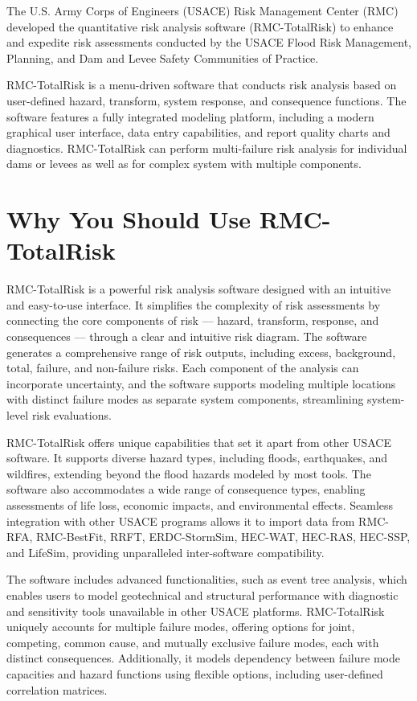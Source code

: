 \documentclass[
]{book}
\begin{document}
The U.S. Army Corps of Engineers (USACE) Risk Management Center (RMC) developed the quantitative risk analysis software (RMC-TotalRisk) to enhance and expedite risk assessments conducted by the USACE Flood Risk Management, Planning, and Dam and Levee Safety Communities of Practice.

RMC-TotalRisk is a menu-driven software that conducts risk analysis based on user-defined hazard, transform, system response, and consequence functions. The software features a fully integrated modeling platform, including a modern graphical user interface, data entry capabilities, and report quality charts and diagnostics. RMC-TotalRisk can perform multi-failure risk analysis for individual dams or levees as well as for complex system with multiple components.

\hypertarget{why-you-should-use-rmc-totalrisk}{%
\section{Why You Should Use RMC-TotalRisk}\label{why-you-should-use-rmc-totalrisk}}

RMC-TotalRisk is a powerful risk analysis software designed with an intuitive and easy-to-use interface. It simplifies the complexity of risk assessments by connecting the core components of risk --- hazard, transform, response, and consequences --- through a clear and intuitive risk diagram. The software generates a comprehensive range of risk outputs, including excess, background, total, failure, and non-failure risks. Each component of the analysis can incorporate uncertainty, and the software supports modeling multiple locations with distinct failure modes as separate system components, streamlining system-level risk evaluations.

RMC-TotalRisk offers unique capabilities that set it apart from other USACE software. It supports diverse hazard types, including floods, earthquakes, and wildfires, extending beyond the flood hazards modeled by most tools. The software also accommodates a wide range of consequence types, enabling assessments of life loss, economic impacts, and environmental effects. Seamless integration with other USACE programs allows it to import data from RMC-RFA, RMC-BestFit, RRFT, ERDC-StormSim, HEC-WAT, HEC-RAS, HEC-SSP, and LifeSim, providing unparalleled inter-software compatibility.

The software includes advanced functionalities, such as event tree analysis, which enables users to model geotechnical and structural performance with diagnostic and sensitivity tools unavailable in other USACE platforms. RMC-TotalRisk uniquely accounts for multiple failure modes, offering options for joint, competing, common cause, and mutually exclusive failure modes, each with distinct consequences. Additionally, it models dependency between failure mode capacities and hazard functions using flexible options, including user-defined correlation matrices.
\end{document}
